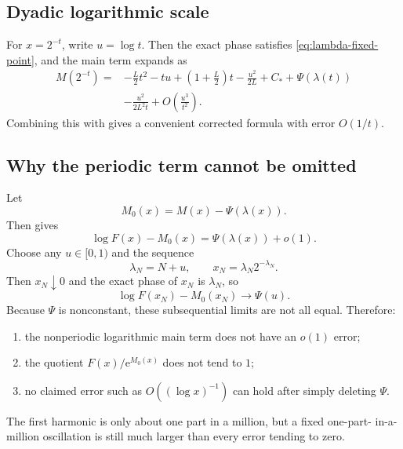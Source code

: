\documentclass[11pt]{article}
\numberwithin{equation}{section}
\theoremstyle{definition}
\theoremstyle{remark}
\newcommand{\e}{\mathrm{e}}
\begin{document}
\subsection{Dyadic logarithmic scale}

For $x=2^{-t}$, write $u=\log t$.  Then the exact phase satisfies
\eqref{eq:lambda-fixed-point}, and the main term expands as
\begin{equation}\label{eq:dyadic-main-expanded}
 \begin{split}
 M(2^{-t})={}&-\frac L2t^2-tu+
 \left(1+\frac L2\right)t
 -\frac{u^2}{2L}+C_*+\Psi(\lambda(t))\\
 &-\frac{u^2}{2L^2t}
 +O\left(\frac{u^3}{t^2}\right).
 \end{split}
\end{equation}
Combining this with  gives a convenient corrected
formula with error $O(1/t)$.

\subsection{Why the periodic term cannot be omitted}

Let
\begin{equation}\label{eq:nonperiodic-main}
 M_0(x)=M(x)-\Psi(\lambda(x)).
\end{equation}
Then  gives
\begin{equation}\label{eq:omission-error}
 \log F(x)-M_0(x)=\Psi(\lambda(x))+o(1).
\end{equation}
Choose any $u\in[0,1)$ and the sequence
\begin{equation}\label{eq:phase-subsequence}
 \lambda_N=N+u,
 \qquad x_N=\lambda_N2^{-\lambda_N}.
\end{equation}
Then $x_N\downarrow0$ and the exact phase of $x_N$ is $\lambda_N$, so
\begin{equation}\label{eq:phase-limit}
 \log F(x_N)-M_0(x_N)\longrightarrow\Psi(u).
\end{equation}
Because $\Psi$ is nonconstant, these subsequential limits are not all equal.
Therefore:
\begin{enumerate}
\item the nonperiodic logarithmic main term does not have an $o(1)$ error;
\item the quotient $F(x)/\e^{M_0(x)}$ does not tend to $1$;
\item no claimed error such as $O((\log x)^{-1})$ can hold after simply
      deleting $\Psi$.
\end{enumerate}
The first harmonic is only about one part in a million, but a fixed one-part-
in-a-million oscillation is still much larger than every error tending to
zero.
\end{document}
